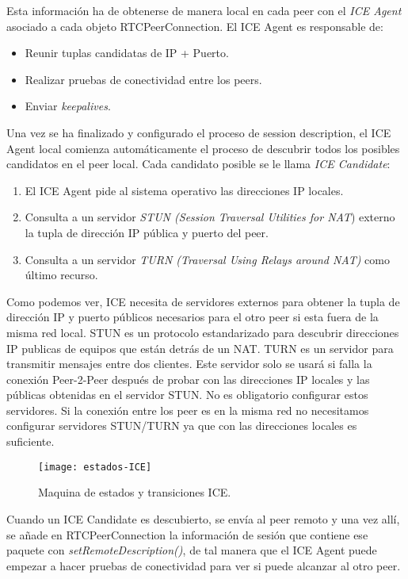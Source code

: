 Esta información ha de obtenerse de manera local en cada peer con el \textit{ICE Agent} asociado a cada objeto RTCPeerConnection. El ICE Agent es responsable de: 

\begin{itemize}
\item Reunir tuplas candidatas de IP + Puerto.
\item Realizar pruebas de conectividad entre los peers.
\item Enviar \textit{keepalives}.
\end{itemize}

Una vez se ha finalizado y configurado el proceso de session description, el ICE Agent local comienza automáticamente el proceso de descubrir todos los posibles candidatos en el peer local. Cada candidato posible se le llama \textit{ICE Candidate}:

\begin{enumerate}
\item El ICE Agent pide al sistema operativo las direcciones IP locales.
\item Consulta a un servidor \emph{STUN (Session Traversal Utilities for NAT}) externo la tupla de dirección IP pública y puerto del peer.
\item Consulta a un servidor \emph{TURN (Traversal Using Relays around NAT)} como último recurso. 
\end{enumerate}

Como podemos ver, ICE necesita de servidores externos para obtener la tupla de dirección IP y puerto públicos necesarios para el otro peer si esta fuera de la misma red local. STUN  es un protocolo estandarizado para descubrir direcciones IP publicas de equipos que están detrás de un NAT. TURN es un servidor para transmitir mensajes entre dos clientes. Este servidor solo se usará si falla la conexión Peer-2-Peer después de probar con las direcciones IP locales y las públicas obtenidas en el servidor STUN. No es obligatorio configurar estos servidores. Si la conexión entre los peer es en la misma red no necesitamos configurar servidores STUN/TURN ya que con las direcciones locales es suficiente.\\

\begin{figure}[htb]
\centering
\texttt{[image: estados-ICE]}
\caption{Maquina de estados y transiciones ICE.}
\label{fig:estados-ice}
\end{figure}

 
Cuando un ICE Candidate es descubierto, se envía al peer remoto y una vez allí, se añade en RTCPeerConnection la información de sesión que contiene ese paquete con \textit{setRemoteDescription()}, de tal manera que el ICE Agent puede empezar a hacer pruebas de conectividad para ver si puede alcanzar al otro peer.\\

